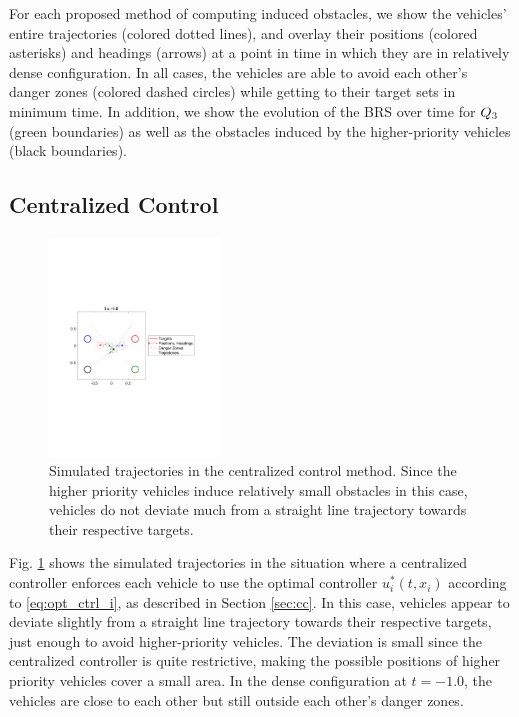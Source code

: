 For each proposed method of computing induced obstacles, we show the vehicles' entire trajectories (colored dotted lines), and overlay their positions (colored asterisks) and headings (arrows) at a point in time in which they are in relatively dense configuration. In all cases, the vehicles are able to avoid each other's danger zones (colored dashed circles) while getting to their target sets in minimum time. In addition, we show the evolution of the BRS over time for $Q_3$ (green boundaries) as well as the obstacles induced by the higher-priority vehicles (black boundaries).

\subsection{Centralized Control}
\vspace{-1em}
\begin{figure}[H]
  \centering
  \includegraphics[width=0.40\textwidth]{"fig/cc_traj"}
  \caption{Simulated trajectories in the centralized control method. Since the higher priority vehicles induce relatively small obstacles in this case, vehicles do not deviate much from a straight line trajectory towards their respective targets.}
  \label{fig:cc_traj}
  \vspace{-1.4em}
\end{figure}
Fig. \ref{fig:cc_traj} shows the simulated trajectories in the situation where a centralized controller enforces each vehicle to use the optimal controller $u^*_i(t, x_i)$ according to \eqref{eq:opt_ctrl_i}, as described in Section \ref{sec:cc}. In this case, vehicles appear to deviate slightly from a straight line trajectory towards their respective targets, just enough to avoid higher-priority vehicles. The deviation is small since the centralized controller is quite restrictive, making the possible positions of higher priority vehicles cover a small area. In the dense configuration at $t=-1.0$, the vehicles are close to each other but still outside each other's danger zones.

